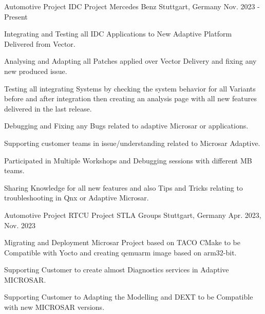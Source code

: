 \begin{cventries}
\cventry
{\normalsize Automotive Project} %
{\Large IDC Project Mercedes Benz} %
{\normalsize Stuttgart, Germany} %
{\normalsize Nov. 2023 - Present} %
{
  \begin{cvitems} %
    \item {Integrating and Testing all IDC Applications to New Adaptive Platform Delivered from Vector.}
    \item {Analysing and Adapting all Patches applied over Vector Delivery and fixing any new produced issue.}
    \item {Testing all integrating Systems by checking the system behavior for all Variants before and after integration then creating an analysis page with all new features delivered in the last release.}
    \item {Debugging and Fixing any Bugs related to adaptive Microsar or applications.}
    \item {Supporting customer teams in issue/understanding related to Microsar Adaptive.}
    \item {Participated in Multiple Workshops and Debugging sessions with different MB teams.}
    \item {Sharing Knowledge for all new features and also Tips and Tricks relating to troubleshooting in Qnx or Adaptive Microsar.}
  \end{cvitems}
}
\cventry
{\normalsize Automotive Project} %
{\Large RTCU Project STLA Groups} %
{\normalsize Stuttgart, Germany} %
{\normalsize Apr. 2023, Nov. 2023} %
{
  \begin{cvitems} %
    \item {Migrating and Deployment Microsar Project based on TACO CMake to be Compatible with Yocto and creating qemuarm image based on arm32-bit.}
    \item {Supporting Customer to create almost Diagnostics services in Adaptive MICROSAR.}
    \item {Supporting Customer to Adapting the Modelling and DEXT to be Compatible with new MICROSAR versions.}

\end{cvitems}}
\end{cventries}
